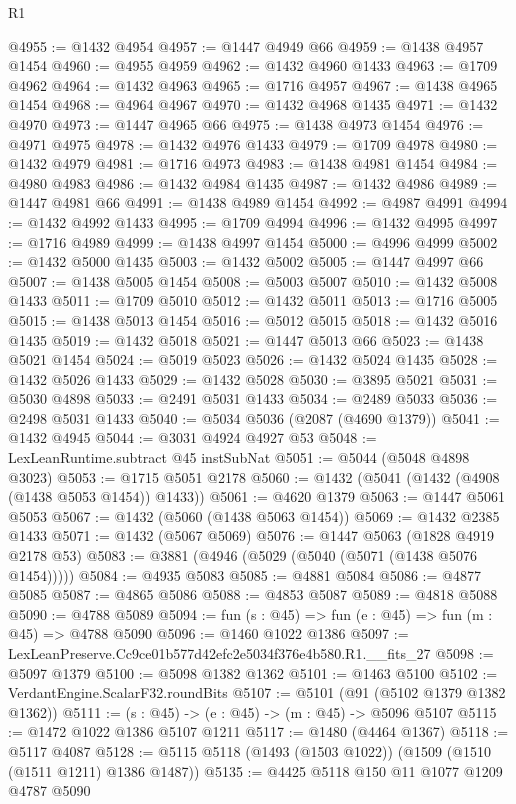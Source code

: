 \begin{lexlean}{R1}
\begin{coremodule}
@4955 := @1432 @4954
@4957 := @1447 @4949 @66
@4959 := @1438 @4957 @1454
@4960 := @4955 @4959
@4962 := @1432 @4960 @1433
@4963 := @1709 @4962
@4964 := @1432 @4963
@4965 := @1716 @4957
@4967 := @1438 @4965 @1454
@4968 := @4964 @4967
@4970 := @1432 @4968 @1435
@4971 := @1432 @4970
@4973 := @1447 @4965 @66
@4975 := @1438 @4973 @1454
@4976 := @4971 @4975
@4978 := @1432 @4976 @1433
@4979 := @1709 @4978
@4980 := @1432 @4979
@4981 := @1716 @4973
@4983 := @1438 @4981 @1454
@4984 := @4980 @4983
@4986 := @1432 @4984 @1435
@4987 := @1432 @4986
@4989 := @1447 @4981 @66
@4991 := @1438 @4989 @1454
@4992 := @4987 @4991
@4994 := @1432 @4992 @1433
@4995 := @1709 @4994
@4996 := @1432 @4995
@4997 := @1716 @4989
@4999 := @1438 @4997 @1454
@5000 := @4996 @4999
@5002 := @1432 @5000 @1435
@5003 := @1432 @5002
@5005 := @1447 @4997 @66
@5007 := @1438 @5005 @1454
@5008 := @5003 @5007
@5010 := @1432 @5008 @1433
@5011 := @1709 @5010
@5012 := @1432 @5011
@5013 := @1716 @5005
@5015 := @1438 @5013 @1454
@5016 := @5012 @5015
@5018 := @1432 @5016 @1435
@5019 := @1432 @5018
@5021 := @1447 @5013 @66
@5023 := @1438 @5021 @1454
@5024 := @5019 @5023
@5026 := @1432 @5024 @1435
@5028 := @1432 @5026 @1433
@5029 := @1432 @5028
@5030 := @3895 @5021
@5031 := @5030 @4898
@5033 := @2491 @5031 @1433
@5034 := @2489 @5033
@5036 := @2498 @5031 @1433
@5040 := @5034 @5036 (@2087 (@4690 @1379))
@5041 := @1432 @4945
@5044 := @3031 @4924 @4927 @53
@5048 := LexLeanRuntime.subtract @45 instSubNat
@5051 := @5044 (@5048 @4898 @3023)
@5053 := @1715 @5051 @2178
@5060 := @1432 (@5041 (@1432 (@4908 (@1438 @5053 @1454)) @1433))
@5061 := @4620 @1379
@5063 := @1447 @5061 @5053
@5067 := @1432 (@5060 (@1438 @5063 @1454))
@5069 := @1432 @2385 @1433
@5071 := @1432 (@5067 @5069)
@5076 := @1447 @5063 (@1828 @4919 @2178 @53)
@5083 := @3881 (@4946 (@5029 (@5040 (@5071 (@1438 @5076 @1454)))))
@5084 := @4935 @5083
@5085 := @4881 @5084
@5086 := @4877 @5085
@5087 := @4865 @5086
@5088 := @4853 @5087
@5089 := @4818 @5088
@5090 := @4788 @5089
@5094 := fun (s : @45) => fun (e : @45) => fun (m : @45) => @4788 @5090
@5096 := @1460 @1022 @1386
@5097 := LexLeanPreserve.Cc9ce01b577d42efc2e5034f376e4b580.R1.__fits_27
@5098 := @5097 @1379
@5100 := @5098 @1382 @1362
@5101 := @1463 @5100
@5102 := VerdantEngine.ScalarF32.roundBits
@5107 := @5101 (@91 (@5102 @1379 @1382 @1362))
@5111 := (s : @45) -> (e : @45) -> (m : @45) -> @5096 @5107
@5115 := @1472 @1022 @1386 @5107 @1211
@5117 := @1480 (@4464 @1367)
@5118 := @5117 @4087
@5128 := @5115 @5118 (@1493 (@1503 @1022)) (@1509 (@1510 (@1511 @1211) @1386 @1487))
@5135 := @4425 @5118 @150 @11 @1077 @1209 @4787 @5090

\end{coremodule}
\end{lexlean}
